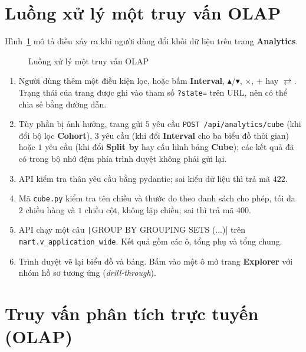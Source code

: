 \section{Luồng xử lý một truy vấn OLAP}
\label{sec:request-flow}
Hình~\ref{fig:flow_request} mô tả điều xảy ra khi người dùng đổi khối dữ liệu trên trang \textbf{Analytics}.

\begin{figure}[H]
	\centering
	\caption{Luồng xử lý một truy vấn OLAP}
	\label{fig:flow_request}
\end{figure}

\begin{enumerate}[topsep=0pt, itemsep=1pt]
	\item Người dùng thêm một điều kiện lọc, hoặc bấm \textbf{Interval}, $\blacktriangle$/$\blacktriangledown$, $\times$, $+$ hay $\rightleftarrows$. Trạng thái của trang được ghi vào tham số \texttt{?state=} trên URL, nên có thể chia sẻ bằng đường dẫn.
	\item Tùy phần bị ảnh hưởng, trang gửi $5$ yêu cầu \texttt{POST /api/analytics/cube} (khi đổi bộ lọc \textbf{Cohort}), $3$ yêu cầu (khi đổi \textbf{Interval} cho ba biểu đồ thời gian) hoặc $1$ yêu cầu (khi đổi \textbf{Split by} hay cấu hình bảng \textbf{Cube}); các kết quả đã có trong bộ nhớ đệm phía trình duyệt không phải gửi lại.
	\item API kiểm tra thân yêu cầu bằng pydantic; sai kiểu dữ liệu thì trả mã $422$.
	\item Mã \texttt{cube.py} kiểm tra tên chiều và thước đo theo danh sách cho phép, tối đa $2$ chiều hàng và $1$ chiều cột, không lặp chiều; sai thì trả mã $400$.
	\item API chạy một câu \texttt|GROUP BY GROUPING SETS (...)| trên \texttt{mart.v\_application\_wide}. Kết quả gồm các ô, tổng phụ và tổng chung.
	\item Trình duyệt vẽ lại biểu đồ và bảng. Bấm vào một ô mở trang \textbf{Explorer} với nhóm hồ sơ tương ứng (\textit{drill-through}).
\end{enumerate}

\section{Truy vấn phân tích trực tuyến (OLAP)}
\label{sec:olap}

